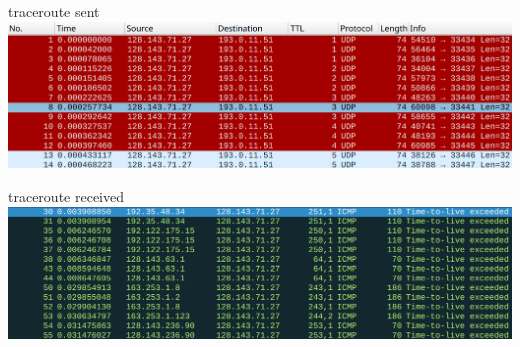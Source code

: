 \begin{frame}{traceroute sent}
\includegraphics[width=\textwidth]{traceroute-v4-send}
\end{frame}

\begin{frame}{traceroute received}
\includegraphics[width=\textwidth]{traceroute-v4-recv}
\end{frame}

